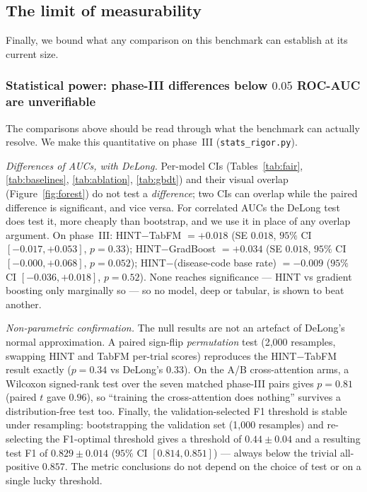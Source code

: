 \documentclass[a4paper,fleqn]{cas-sc}
\begin{document}
\subsection{The limit of measurability}
Finally, we bound what any comparison on this benchmark can establish at its current size.
\subsubsection{Statistical power: phase-III differences below $0.05$ ROC-AUC are unverifiable}
\label{sec:power}
The comparisons above should be read through what the benchmark can actually resolve. We make
this quantitative on phase~III (\texttt{stats\_rigor.py}).

\emph{Differences of AUCs, with DeLong.} Per-model CIs (Tables~\ref{tab:fair},
\ref{tab:baselines}, \ref{tab:ablation}, \ref{tab:gbdt}) and their visual overlap
(Figure~\ref{fig:forest}) do not test a \emph{difference}; two CIs can overlap while the
paired difference is significant, and vice versa. For correlated AUCs the DeLong test does test
it, more cheaply than bootstrap, and we use it in place of any overlap argument. On phase~III:
HINT$-$TabFM $=+0.018$ (SE $0.018$, $95\%$ CI $[-0.017,+0.053]$, $p=0.33$); HINT$-$GradBoost
$=+0.034$ (SE $0.018$, $95\%$ CI $[-0.000,+0.068]$, $p=0.052$); HINT$-$(disease-code base rate)
$=-0.009$ ($95\%$ CI $[-0.036,+0.018]$, $p=0.52$). None reaches significance --- HINT vs
gradient boosting only marginally so --- so no model, deep or tabular, is shown to beat another.

\emph{Non-parametric confirmation.} The null results are not an artefact of DeLong's normal
approximation. A paired sign-flip \emph{permutation} test (2{,}000 resamples, swapping HINT and
TabFM per-trial scores) reproduces the HINT$-$TabFM result exactly ($p=0.34$ vs DeLong's
$0.33$). On the A/B cross-attention arms, a Wilcoxon signed-rank test over the seven matched
phase-III pairs gives $p=0.81$ (paired $t$ gave $0.96$), so ``training the cross-attention does
nothing'' survives a distribution-free test too. Finally, the validation-selected F1 threshold
is stable under resampling: bootstrapping the validation set (1{,}000 resamples) and re-selecting
the F1-optimal threshold gives a threshold of $0.44\pm0.04$ and a resulting test F1 of
$0.829\pm0.014$ ($95\%$ CI $[0.814,0.851]$) --- always below the trivial all-positive $0.857$.
The metric conclusions do not depend on the choice of test or on a single lucky threshold.
\end{document}
